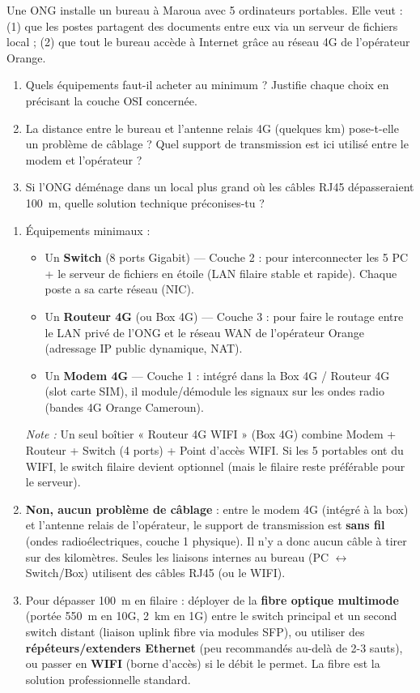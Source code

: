 \documentclass[11pt]{article}
\begin{document}
\begin{exercice}
Une ONG installe un bureau à Maroua avec 5 ordinateurs portables. Elle veut : (1) que les postes partagent des documents entre eux via un serveur de fichiers local ; (2) que tout le bureau accède à Internet grâce au réseau 4G de l'opérateur Orange. 
\begin{enumerate}
\item Quels équipements faut-il acheter au minimum ? Justifie chaque choix en précisant la couche OSI concernée.
\item La distance entre le bureau et l'antenne relais 4G (quelques km) pose-t-elle un problème de câblage ? Quel support de transmission est ici utilisé entre le modem et l'opérateur ?
\item Si l'ONG déménage dans un local plus grand où les câbles RJ45 dépasseraient \SI{100}{m}, quelle solution technique préconises-tu ?
\end{enumerate}
\end{exercice}

\begin{corrige}
\begin{enumerate}
\item Équipements minimaux :
\begin{itemize}
\item Un \textbf{Switch} (8 ports Gigabit) — Couche 2 : pour interconnecter les 5 PC + le serveur de fichiers en étoile (LAN filaire stable et rapide). Chaque poste a sa carte réseau (NIC).
\item Un \textbf{Routeur 4G} (ou Box 4G) — Couche 3 : pour faire le routage entre le LAN privé de l'ONG et le réseau WAN de l'opérateur Orange (adressage IP public dynamique, NAT).
\item Un \textbf{Modem 4G} — Couche 1 : intégré dans la Box 4G / Routeur 4G (slot carte SIM), il module/démodule les signaux sur les ondes radio (bandes 4G Orange Cameroun).
\end{itemize}
\textit{Note :} Un seul boîtier « Routeur 4G WIFI » (Box 4G) combine Modem + Routeur + Switch (4 ports) + Point d'accès WIFI. Si les 5 portables ont du WIFI, le switch filaire devient optionnel (mais le filaire reste préférable pour le serveur).
\item \textbf{Non, aucun problème de câblage} : entre le modem 4G (intégré à la box) et l'antenne relais de l'opérateur, le support de transmission est \textbf{sans fil} (ondes radioélectriques, couche 1 physique). Il n'y a donc aucun câble à tirer sur des kilomètres. Seules les liaisons internes au bureau (PC $\leftrightarrow$ Switch/Box) utilisent des câbles RJ45 (ou le WIFI).
\item Pour dépasser \SI{100}{m} en filaire : déployer de la \textbf{fibre optique multimode} (portée \SI{550}{m} en 10G, \SI{2}{km} en 1G) entre le switch principal et un second switch distant (liaison uplink fibre via modules SFP), ou utiliser des \textbf{répéteurs/extenders Ethernet} (peu recommandés au-delà de 2-3 sauts), ou passer en \textbf{WIFI} (borne d'accès) si le débit le permet. La fibre est la solution professionnelle standard.
\end{enumerate}
\end{corrige}
\end{document}

